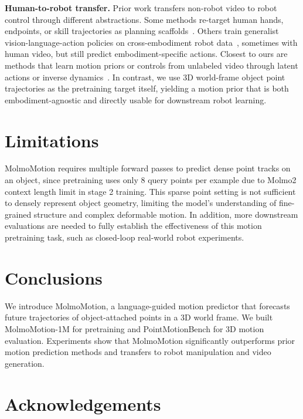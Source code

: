 \documentclass{llmxive}
\providecommand{\modelname}{MolmoMotion\xspace}
\providecommand{\benchmarkname}{PointMotionBench\xspace}
\begin{document}
\noindent\textbf{Human-to-robot transfer.}
Prior work transfers non-robot video to robot control through different abstractions. Some methods re-target human hands, endpoints, or skill trajectories as planning scaffolds~\cite{bahl2023affordances, vidbot,fang2026molmoact2, traj2action, bharadhwaj2024gen2act, li2025h2r}. Others train generalist vision-language-action policies on cross-embodiment robot data~\cite{bousmalis2023robocat, padalkar2024openx, octo2024, openvla, pi0}, sometimes with human video, but still predict embodiment-specific actions. Closest to ours are methods that learn motion priors or controls from unlabeled video through latent actions or inverse dynamics~\cite{bahl2023swim, dexwm, latentactionwild, lapa, egovla}. In contrast, we use 3D world-frame object point trajectories as the pretraining target itself, yielding a motion prior that is both embodiment-agnostic and directly usable for downstream robot learning.



\section{Limitations} 
\modelname requires multiple forward passes to predict dense point tracks on an object,  since pretraining uses only 8 query points per example due to Molmo2 context length limit in stage 2 training. This sparse point setting is not sufficient to densely represent object geometry, limiting the model's understanding of fine-grained structure and complex deformable motion. In addition, more downstream evaluations are needed to fully establish the effectiveness of this motion pretraining task, such as closed-loop real-world robot experiments. 




\section{Conclusions}
We introduce \modelname, a language-guided motion predictor that forecasts future trajectories of object-attached points in a 3D world frame. We built MolmoMotion-1M for pretraining and \benchmarkname{} for 3D motion evaluation. Experiments show that \modelname significantly outperforms prior motion prediction methods and transfers to robot manipulation and video generation.




\section*{Acknowledgements}
\end{document}
